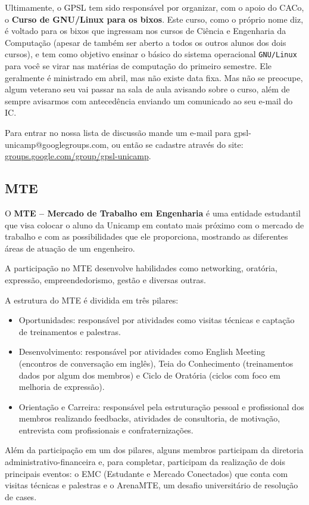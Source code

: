 Ultimamente, o GPSL tem sido responsável por organizar, com o apoio do
CACo, o \textbf{Curso de GNU/Linux para os bixos}. Este curso, como o
próprio nome diz, é voltado para os bixos que ingressam nos cursos de
Ciência e Engenharia da Computação (apesar de também ser aberto a todos
os outros alunos dos dois cursos), e tem como objetivo ensinar o
básico do sistema operacional \texttt{GNU/Linux} para você se virar
nas matérias de computação do primeiro semestre. Ele geralmente é
ministrado em abril, mas não existe data fixa. Mas não se preocupe,
algum veterano seu vai passar na sala de aula avisando sobre o curso,
além de sempre avisarmos com antecedência enviando um comunicado ao
seu e-mail do IC.

Para entrar no nossa lista de discussão mande um e-mail para
gpsl-unicamp@googlegroups.com, ou então se cadastre através do site:
\url{groups.google.com/group/gpsl-unicamp}.

\subsection{MTE}

O \textbf{MTE -- Mercado de Trabalho em Engenharia} é uma entidade estudantil que visa colocar o aluno da Unicamp em
contato mais próximo com o mercado de trabalho e com as possibilidades que ele
proporciona, mostrando as diferentes áreas de atuação de um engenheiro.

A participação no MTE desenvolve habilidades como networking, oratória, expressão, empreendedorismo, gestão e diversas outras.

A estrutura do MTE é dividida em três pilares:

\begin{itemize}
\item Oportunidades: responsável por atividades como visitas técnicas e captação de treinamentos e palestras.
\item Desenvolvimento: responsável por atividades como English Meeting (encontros de conversação em inglês), Teia do Conhecimento (treinamentos dados por algum dos membros) e Ciclo de Oratória (ciclos com foco em melhoria de expressão).
\item Orientação e Carreira: responsável pela estruturação pessoal e profissional dos membros realizando feedbacks, atividades de consultoria, de motivação, entrevista com profissionais e confraternizações.
\end{itemize}

Além da participação em um dos pilares, alguns membros participam da diretoria administrativo-financeira e, para completar, participam da realização de dois principais eventos: o EMC (Estudante e Mercado Conectados) que conta com visitas técnicas e palestras e o ArenaMTE, um desafio universitário de resolução de cases.

